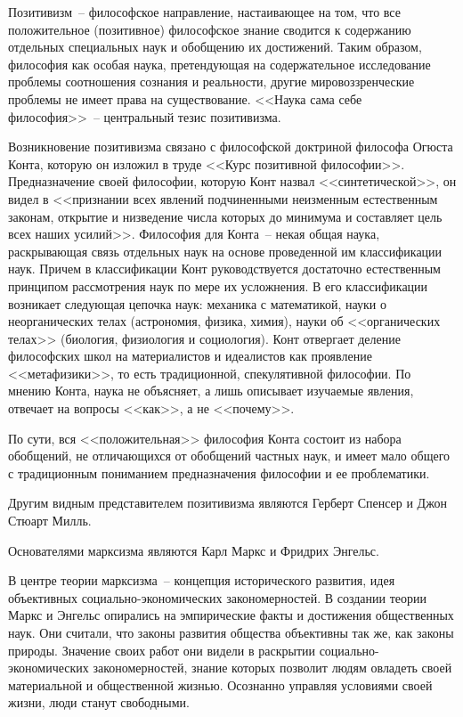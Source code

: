
Позитивизм~-- философское направление, настаивающее на том, что все положительное (позитивное)
философское знание сводится к содержанию отдельных специальных наук и обобщению их достижений. Таким
образом, философия как особая наука, претендующая на содержательное исследование проблемы
соотношения сознания и реальности, другие мировоззренческие проблемы не имеет права на
существование. <<Наука сама себе философия>>~-- центральный тезис позитивизма.

Возникновение позитивизма связано с философской доктриной философа Огюста Конта, которую он изложил
в труде <<Курс позитивной философии>>. Предназначение своей философии, которую Конт назвал
<<синтетической>>, он видел в <<признании всех явлений подчиненными неизменным естественным законам,
открытие и низведение числа которых до минимума и составляет цель всех наших усилий>>. Философия для
Конта~-- некая общая наука, раскрывающая связь отдельных наук на основе проведенной им классификации
наук. Причем в классификации Конт руководствуется достаточно естественным принципом рассмотрения
наук по мере их усложнения. В его классификации возникает следующая цепочка наук: механика с
математикой, науки о неорганических телах (астрономия, физика, химия), науки об <<органических
телах>> (биология, физиология и социология). Конт отвергает деление философских школ на
материалистов и идеалистов как проявление <<метафизики>>, то есть традиционной, спекулятивной
философии. По мнению Конта, наука не объясняет, а лишь описывает изучаемые явления, отвечает на
вопросы <<как>>, а не <<почему>>.

По сути, вся <<положительная>> философия Конта состоит из набора обобщений, не отличающихся от
обобщений частных наук, и имеет мало общего с традиционным пониманием предназначения философии и ее
проблематики.

Другим видным представителем позитивизма являются Герберт Спенсер и Джон Стюарт Милль.

Основателями марксизма являются Карл Маркс и Фридрих Энгельс. 

В центре теории марксизма~-- концепция исторического развития, идея объективных
социально-экономических закономерностей. В создании теории Маркс и Энгельс опирались на эмпирические
факты и достижения общественных наук. Они считали, что законы развития общества объективны так же,
как законы природы. Значение своих работ они видели в раскрытии социально-экономических
закономерностей, знание которых позволит людям овладеть своей материальной и общественной жизнью.
Осознанно управляя условиями своей жизни, люди станут свободными.

